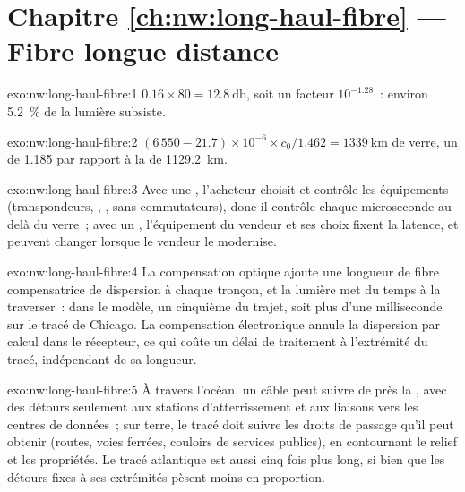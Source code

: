 \section*{Chapitre \ref{ch:nw:long-haul-fibre} --- Fibre longue distance}

\begin{solution}{exo:nw:long-haul-fibre:1}
$0.16 \times 80 = \qty{12.8}{\decibel}$, soit un facteur $10^{-1.28}$~: environ 5.2~\% de la lumière subsiste.
\end{solution}

\begin{solution}{exo:nw:long-haul-fibre:2}
$(6\,550 - 21.7) \times 10^{-6} \times c_0 / 1.462 = \qty{1339}{\kilo\metre}$ de verre, un  de 1.185 par rapport à la
 de \qty{1129.2}{\kilo\metre}.
\end{solution}

\begin{solution}{exo:nw:long-haul-fibre:3}
Avec une , l'acheteur choisit et contrôle les équipements (transpondeurs, , , sans commutateurs), donc il contrôle chaque
microseconde au-delà du verre~; avec un , l'équipement du vendeur et ses choix fixent la latence, et peuvent changer lorsque le vendeur
le modernise.
\end{solution}

\begin{solution}{exo:nw:long-haul-fibre:4}
La compensation optique ajoute une longueur de fibre compensatrice de dispersion à chaque tronçon, et la lumière met du temps à la traverser~: dans le modèle, un cinquième du
trajet, soit plus d'une milliseconde sur le tracé de Chicago. La compensation électronique annule la dispersion par calcul dans le récepteur, ce qui coûte un
délai de traitement à l'extrémité du tracé, indépendant de sa longueur.
\end{solution}

\begin{solution}{exo:nw:long-haul-fibre:5}
À travers l'océan, un câble peut suivre de près la , avec des détours seulement aux stations d'atterrissement et aux liaisons vers les centres de données~; sur terre, le tracé
doit suivre les droits de passage qu'il peut obtenir (routes, voies ferrées, couloirs de services publics), en contournant le relief et les propriétés. Le tracé atlantique est aussi
cinq fois plus long, si bien que les détours fixes à ses extrémités pèsent moins en proportion.
\end{solution}

